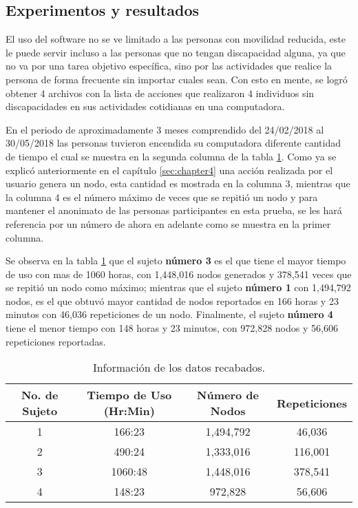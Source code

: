 \subsection{Experimentos y resultados}

El uso del software no se ve limitado a las personas con movilidad reducida,
 este le puede servir incluso a las personas que no tengan discapacidad 
 alguna, ya que no va por una tarea objetivo espec\'ifica, sino por las 
 actividades que realice la persona de forma frecuente sin importar cuales 
 sean. Con esto en mente, se logr\'o obtener 4 archivos con la lista de 
 acciones que realizaron 4 individuos sin discapacidades en sus actividades 
 cotidianas en una computadora.


En el periodo de aproximadamente 3 meses comprendido del 24/02/2018 al 
 30/05/2018 las personas tuvieron encendida su computadora diferente cantidad 
 de tiempo el cual se muestra en la segunda columna de la tabla 
 \ref{infodata}. Como ya se explic\'o anteriormente en el cap\'itulo 
 \ref{sec:chapter4} una acci\'on realizada por el usuario genera un nodo, 
 esta cantidad es mostrada en la columna 3, mientras que la columna 4 es el 
 n\'umero m\'aximo de veces que se repiti\'o un nodo y para mantener el 
 anonimato de las personas participantes en esta prueba, se les har\'a 
 referencia por un n\'umero de ahora en adelante como se muestra en la primer 
 columna. 

Se observa en la tabla \ref{infodata} que el sujeto \textbf{n\'umero 3}
 es el que tiene el mayor tiempo de uso con mas de 1060 horas, con
 1,448,016 nodos generados y 378,541 veces que se repiti\'o un nodo como 
 m\'aximo; mientras que el sujeto \textbf{n\'umero 1} con 1,494,792 nodos, es 
 el que obtuv\'o mayor cantidad de nodos reportados en 166 horas y 23 minutos 
 con 46,036 repeticiones de un nodo. Finalmente, el sujeto \textbf{n\'umero 
 4} tiene el menor tiempo con 148 horas y 23 minutos, con 972,828 nodos y 
 56,606 repeticiones reportadas.


\begin{table}[]
\centering
\begin{tabular}{cccc}
\hline
No. de Sujeto	
&   Tiempo de Uso (Hr:Min)		
&	N\'umero de Nodos	
&   Repeticiones 	\\   
\hline

1				
&	166:23 						
&	1,494,792			
&	46,036				\\
		
2
&	490:24
&	1,333,016
&	116,001				\\
		
3
&	1060:48
&	1,448,016
&	378,541				\\
		
4
&	148:23
&	972,828
&	56,606				\\ 
\hline

\end{tabular}
\caption{Informaci\'on de los datos recabados.}
\label{infodata}
\end{table}

